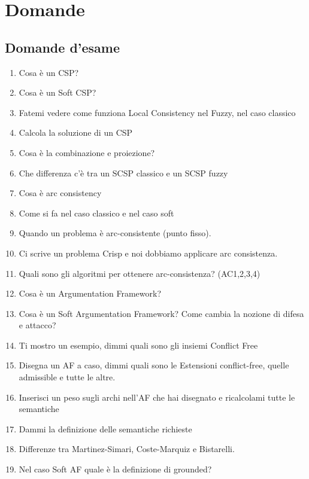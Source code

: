 \chapter{Domande} \label{Domande}
\section{Domande d'esame}
\begin{enumerate}
    \item Cosa è un CSP?
    \item Cosa è un Soft CSP?
    \item Fatemi vedere come funziona Local Consistency nel Fuzzy, nel caso
          classico
    \item Calcola la soluzione di un CSP
    \item Cosa è la combinazione e proiezione?
    \item Che differenza c'è tra un SCSP classico e un SCSP fuzzy
    \item Cosa è arc consistency
    \item Come si fa nel caso classico e nel caso soft
    \item Quando un problema è arc-consistente (punto fisso).
    \item Ci scrive un problema Crisp e noi dobbiamo applicare arc consistenza.
    \item Quali sono gli algoritmi per ottenere arc-consistenza? (AC1,2,3,4)
    \item Cosa è un Argumentation Framework?
    \item Cosa è un Soft Argumentation Framework? Come cambia la nozione di
          difesa e attacco?
    \item Ti mostro un esempio, dimmi quali sono gli insiemi Conflict Free
    \item Disegna un AF a caso, dimmi quali sono le Estensioni conflict-free,
          quelle admissible e tutte le altre.
    \item Inserisci un peso sugli archi nell'AF che hai disegnato e ricalcolami
          tutte le semantiche
    \item Dammi la definizione delle semantiche richieste
    \item Differenze tra Martinez-Simari, Coste-Marquiz e Bistarelli.
    \item Nel caso Soft AF quale è la definizione di grounded?
\end{enumerate}

